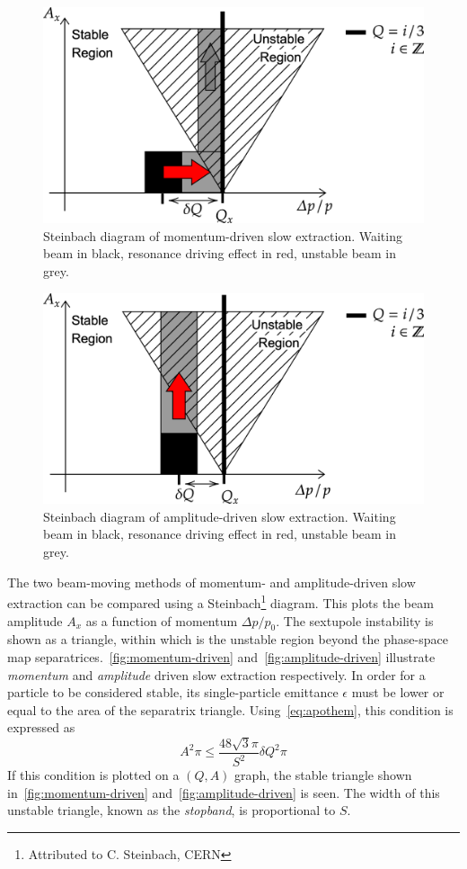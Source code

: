 \documentclass[11pt]{report}
\begin{document}
\begin{figure}[ht]
  \centering
  \includegraphics[width=0.6\linewidth]{momentum-driven.png}
  \caption{Steinbach diagram of momentum-driven slow extraction. Waiting beam in black, resonance driving effect in red, unstable beam in grey.}\label{fig:momentum-driven}
\end{figure}

\begin{figure}[ht]
  \centering
  \includegraphics[width=0.6\linewidth]{amplitude-driven.png}
  \caption{Steinbach diagram of amplitude-driven slow extraction. Waiting beam in black, resonance driving effect in red, unstable beam in grey.}\label{fig:amplitude-driven}
\end{figure}

The two beam-moving methods of momentum- and amplitude-driven slow extraction can be compared using a Steinbach\footnote{Attributed to C. Steinbach, CERN} diagram. This plots the beam amplitude $A_x$ as a function of momentum $\Delta p/p_0$. The sextupole instability is shown as a triangle, within which is the unstable region beyond the phase-space map separatrices.~\autoref{fig:momentum-driven} and~\autoref{fig:amplitude-driven} illustrate \textit{momentum} and \textit{amplitude} driven slow extraction respectively.
In order for a particle to be considered stable, its single-particle emittance $\epsilon$ must be lower or equal to the area of the separatrix triangle. Using~\autoref{eq:apothem}, this condition is expressed as
\begin{equation}
  A^2\pi\le\frac{48\sqrt 3\pi}{S^2}\delta Q^2\pi
  \label{eq:steinbach}
\end{equation} 
If this condition is plotted on a $(Q, A)$ graph, the stable triangle shown in~\autoref{fig:momentum-driven} and~\autoref{fig:amplitude-driven} is seen. The width of this unstable triangle, known as the \textit{stopband}, is proportional to $S$.
\end{document}
